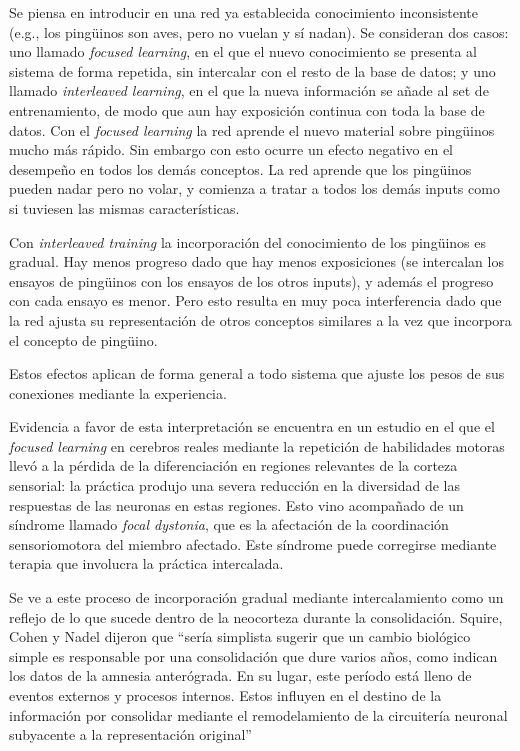 \documentclass[a4paper,12pt]{article}
\begin{document}
Se piensa en introducir en una red ya establecida conocimiento inconsistente (e.g., los pingüinos son aves, pero no vuelan y sí nadan). Se consideran dos casos: uno llamado {\itshape focused learning}, en el que el nuevo conocimiento se presenta al sistema de forma repetida, sin intercalar con el resto de la base de datos; y uno llamado {\itshape interleaved learning}, en el que la nueva información se añade al set de entrenamiento, de modo que aun hay exposición continua con toda la base de datos. Con el {\itshape focused learning} la red aprende el nuevo material sobre pingüinos mucho más rápido. Sin embargo con esto ocurre un efecto negativo en el desempeño en todos los demás conceptos. La red aprende que los pingüinos pueden nadar pero no volar, y comienza a tratar a todos los demás inputs como si tuviesen las mismas características.

Con {\itshape interleaved training} la incorporación del conocimiento de los pingüinos es gradual. Hay menos progreso dado que hay menos exposiciones (se intercalan los ensayos de pingüinos con los ensayos de los otros inputs), y además el progreso con cada ensayo es menor. Pero esto resulta en muy poca interferencia dado que la red ajusta su representación de otros conceptos similares a la vez que incorpora el concepto de pingüino.

Estos efectos aplican de forma general a todo sistema que ajuste los pesos de sus conexiones mediante la experiencia. 

Evidencia a favor de esta interpretación se encuentra en un estudio en el que el {\itshape focused learning} en cerebros reales mediante la repetición de habilidades motoras llevó a la pérdida de la diferenciación en regiones relevantes de la corteza sensorial: la práctica produjo una severa reducción en la diversidad de las respuestas de las neuronas en estas regiones. Esto vino acompañado de un síndrome llamado {\itshape focal dystonia}, que es la afectación de la coordinación sensoriomotora del miembro afectado. Este síndrome puede corregirse mediante terapia que involucra la práctica intercalada.

Se ve a este proceso de incorporación gradual mediante intercalamiento como un reflejo de lo que sucede dentro de la neocorteza durante la consolidación. Squire, Cohen y Nadel dijeron que ``sería simplista sugerir que un cambio biológico simple es responsable por una consolidación que dure varios años, como indican los datos de la amnesia anterógrada. En su lugar, este período está lleno de eventos externos y procesos internos. Estos influyen en el destino de la información por consolidar mediante el remodelamiento de la circuitería neuronal subyacente a la representación original''
\end{document}
